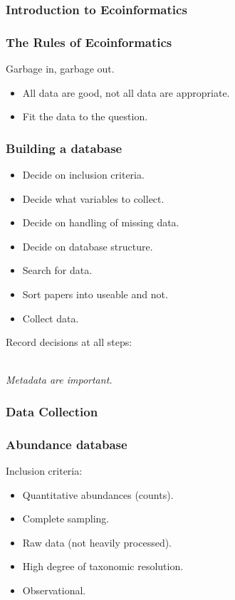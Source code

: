 \documentclass[14pt]{beamer}
\begin{document}
\subsubsection{Introduction to Ecoinformatics}
\begin{frame}[t]
\frametitle{The Rules of Ecoinformatics}
\begin{Large}
Garbage in, garbage out.\\
\end{Large}
\begin{itemize}
\item All data are good, not all data are appropriate.
\item Fit the data to the question.
\end{itemize}
\end{frame}

\begin{frame}[t]{}
\frametitle{Building a database}
\begin{itemize}
\item Decide on inclusion criteria.
\item Decide what variables to collect.
\item Decide on handling of missing data.
\item Decide on database structure.
\item Search for data.
\item Sort papers into useable and not.
\item Collect data.
\end{itemize}
\begin{center}
Record decisions at all steps:\\
~\\
\begin{large}
\emph{Metadata are important.}
\end{large}
\end{center}
\end{frame}


\subsubsection{Data Collection}
\begin{frame}[t]{}
\frametitle{Abundance database}
Inclusion criteria:
\begin{itemize}
\item Quantitative abundances (counts).
\item Complete sampling.
\item Raw data (not heavily processed).
\item High degree of taxonomic resolution.
\item Observational.
\end{itemize}
\end{frame}
\end{document}
